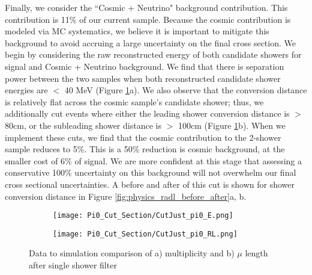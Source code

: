 
Finally, we consider the ``Cosmic + Neutrino" background contribution. This contribution is 11\% of our current sample. Because the cosmic contribution is modeled via MC systematics, we believe it is important to mitigate this background to avoid accruing a large uncertainty on the final cross section.  We begin by considering the raw reconstructed energy of both candidate showers for signal and Cosmic + Neutrino background. We find that there is separation power between the two samples when both reconstructed candidate shower energies are $<$ 40 MeV (Figure \ref{fig:cutjust_pi0_e}a).  We also observe that the conversion distance is relatively flat across the cosmic sample's candidate shower; thus, we additionally cut events where either the leading shower conversion distance is $>$ 80cm, or the subleading shower distance is $>$ 100cm (Figure \ref{fig:cutjust_pi0_e}b). When we implement these cuts, we find that the cosmic contribution to the 2-shower sample reduces to 5\%. This is a 50\% reduction is cosmic background, at the smaller cost of 6\% of signal. We are more confident at this stage that assessing a conservative 100\% uncertainty on this background will not overwhelm our final cross sectional uncertainties. A before and after of this cut is shown for shower conversion distance in Figure \ref{fig:physics_radl_before_after}a, b.
 

\begin{figure}[H]
\centering
  \begin{subfigure}[t]{0.4\textwidth}
    \centering
\texttt{[image: Pi0\_Cut\_Section/CutJust\_pi0\_E.png]}
  \caption{ }
  \end{subfigure} 
  \hspace{20mm}
  \begin{subfigure}[t]{0.4\textwidth}
    \centering
\texttt{[image: Pi0\_Cut\_Section/CutJust\_pi0\_RL.png]}
  \caption{ }
  \end{subfigure} 
\caption{ Data to simulation comparison of a) multiplicity and b) $\mu$ length after single shower filter }
\label{fig:cutjust_pi0_e}
\end{figure}

